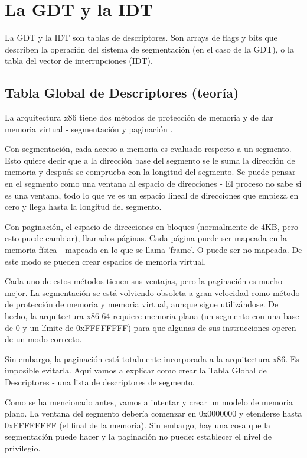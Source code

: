 \documentclass{report}
\begin{document}
\chapter{La GDT y la IDT}

La GDT y la IDT son tablas de descriptores. Son arrays de flags y bits que describen la operación del sistema de segmentación (en el caso de la GDT), o la tabla del vector de interrupciones (IDT).


\section{Tabla Global de Descriptores (teoría)}

La arquitectura x86 tiene dos métodos de protección de memoria y de dar memoria virtual - segmentación y paginación .

Con segmentación, cada acceso a memoria es evaluado respecto a un segmento. Esto quiere decir que a la dirección base del segmento se le suma la dirección de memoria y después se comprueba con la longitud del segmento. Se puede pensar en el segmento como una ventana al espacio de direcciones - El proceso no sabe si es una ventana, todo lo que ve es un espacio lineal de direcciones que empieza en cero y llega hasta la longitud del segmento.

Con paginación, el espacio de direcciones en bloques (normalmente de 4KB, pero esto puede cambiar), llamados páginas. Cada página puede ser mapeada en la memoria física - mapeada en lo que se llama 'frame'. O puede ser no-mapeada. De este modo se pueden crear espacios de memoria virtual.

Cada uno de estos métodos tienen sus ventajas, pero la paginación es mucho mejor. La segmentación se está volviendo obsoleta a gran velocidad como método de protección de memoria y memoria virtual, aunque sigue utilizándose. De hecho, la arquitectura x86-64 requiere memoria plana (un segmento con una base de 0 y un límite de 0xFFFFFFFF) para que algunas de sus instrucciones operen de un modo correcto.

Sin embargo, la paginación está totalmente incorporada a la arquitectura x86. Es imposible evitarla. Aquí vamos a explicar como crear la Tabla Global de Descriptores - una lista de descriptores de segmento.

Como se ha mencionado antes, vamos a intentar y crear un modelo de memoria plano. La ventana del segmento debería comenzar en 0x0000000 y etenderse hasta 0xFFFFFFFF (el final de la memoria). Sin embargo, hay una cosa que la segmentación puede hacer y la paginación no puede: establecer el nivel de privilegio.
\end{document}
